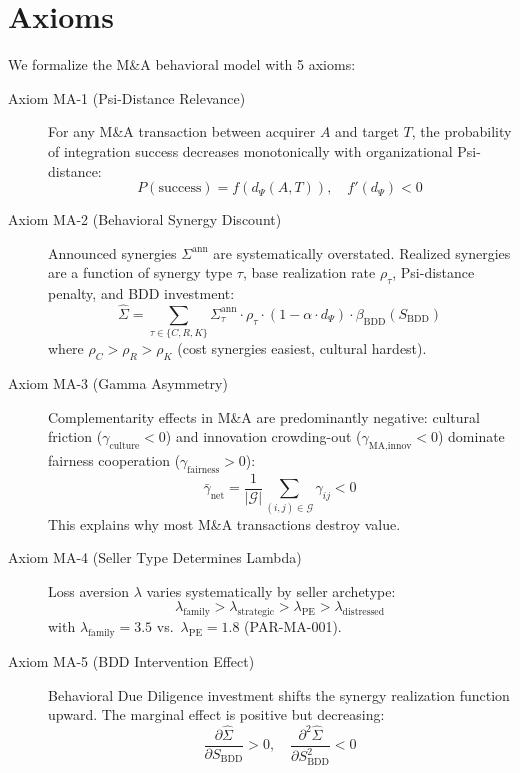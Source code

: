 \section{Axioms}
\label{sec:ma-axioms}

We formalize the M\&A behavioral model with 5 axioms:

\begin{description}
\item[Axiom MA-1 (Psi-Distance Relevance)]
    For any M\&A transaction between acquirer $A$ and target $T$, the probability
    of integration success decreases monotonically with organizational Psi-distance:
    \[
    P(\text{success}) = f(d_\Psi(A,T)), \quad f'(d_\Psi) < 0
    \]

\item[Axiom MA-2 (Behavioral Synergy Discount)]
    Announced synergies $\Sigma^{\text{ann}}$ are systematically overstated.
    Realized synergies are a function of synergy type $\tau$, base realization
    rate $\rho_\tau$, Psi-distance penalty, and BDD investment:
    \[
    \hat{\Sigma} = \sum_{\tau \in \{C,R,K\}} \Sigma_\tau^{\text{ann}} \cdot \rho_\tau
    \cdot (1 - \alpha \cdot d_\Psi) \cdot \beta_{\text{BDD}}(S_{\text{BDD}})
    \]
    where $\rho_C > \rho_R > \rho_K$ (cost synergies easiest, cultural hardest).

\item[Axiom MA-3 (Gamma Asymmetry)]
    Complementarity effects in M\&A are predominantly negative: cultural friction
    ($\gamma_{\text{culture}} < 0$) and innovation crowding-out
    ($\gamma_{\text{MA,innov}} < 0$) dominate fairness cooperation
    ($\gamma_{\text{fairness}} > 0$):
    \[
    \bar{\gamma}_{\text{net}} = \frac{1}{|\mathcal{G}|} \sum_{(i,j) \in \mathcal{G}} \gamma_{ij} < 0
    \]
    This explains why most M\&A transactions destroy value.

\item[Axiom MA-4 (Seller Type Determines Lambda)]
    Loss aversion $\lambda$ varies systematically by seller archetype:
    \[
    \lambda_{\text{family}} > \lambda_{\text{strategic}} > \lambda_{\text{PE}} > \lambda_{\text{distressed}}
    \]
    with $\lambda_{\text{family}} = 3.5$ vs.\ $\lambda_{\text{PE}} = 1.8$ (PAR-MA-001).

\item[Axiom MA-5 (BDD Intervention Effect)]
    Behavioral Due Diligence investment shifts the synergy realization function
    upward. The marginal effect is positive but decreasing:
    \[
    \frac{\partial \hat{\Sigma}}{\partial S_{\text{BDD}}} > 0, \quad
    \frac{\partial^2 \hat{\Sigma}}{\partial S_{\text{BDD}}^2} < 0
    \]
\end{description}


